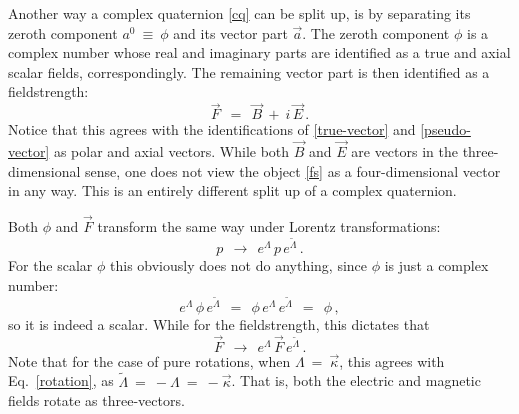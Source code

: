 \documentclass[epsfig,12pt]{article}
\newcommand{\wt}{\widetilde}
\begin{document}
	Another way a complex quaternion \eqref{cq} can be split up, is by separating its zeroth component $ a^0 ~\equiv~ \phi $
	and its vector part $ \vec a $.
	The zeroth component $ \phi $ is a complex number whose real and imaginary parts are identified
	as a true and axial scalar fields, correspondingly.
	The remaining vector part is then identified as a fieldstrength:
\begin{equation}
\label{fs}
	\vec F	~~=~~	\vec B  ~+~  i\,\vec E\,.
\end{equation}
	Notice that this agrees with the identifications of \eqref{true-vector} and \eqref{pseudo-vector}
	as polar and axial vectors.
	While both $ \vec B $ and $ \vec E $ are vectors in the three-dimensional sense,
	one does not view the object \eqref{fs} as a four-dimensional vector in any way.
	This is an entirely different split up of a complex quaternion.

	Both $ \phi $ and $ \vec F $ transform the same way under Lorentz transformations:
\begin{equation}
	p	~~\to~~	e^\Lambda\,p\,e^{\wt\Lambda}\,.
\end{equation}
	For the scalar $ \phi $ this obviously does not do anything, since $ \phi $ is just a complex number:
\[
	e^\Lambda\,\phi\,e^{\wt\Lambda}	~~=~~	\phi\, e^\Lambda\, e^{\wt\Lambda}	~~=~~	\phi\,,
\]
	so it is indeed a scalar.
	While for the fieldstrength, this dictates that
\begin{equation}
	\vec F		~~\to~~		e^\Lambda\,\vec F\,e^{\wt\Lambda}\,.
\end{equation}
	Note that for the case of pure rotations, when $ \Lambda ~=~ \vec\kappa $,
	this agrees with Eq.~\eqref{rotation}, as $ \wt\Lambda ~=~ -\Lambda ~=~ -\vec\kappa $.
	That is, both the electric and magnetic fields rotate as three-vectors.
\end{document}
